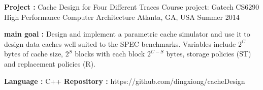 \begin{cventries}
\cventry
{\textbf{Project :} Cache Design for Four Different Traces} 
{Course project: Gatech CS6290 High Performance Computer Architecture} 
{Atlanta, GA, USA} %
{Summer 2014} %
{
  \begin{cvitems}
  \item {\textbf{main goal :} Design and implement a parametric cache
      simulator and use it to design data caches well suited to the SPEC benchmarks. 
      Variables include $2^C$ bytes of cache size, $2^S$ blocks with each block $2^{C-S}$ bytes,
      storage policies (ST) and replacement policies (R).
    }
  \item {\textbf{Language :} C++  \quad
      \textbf{Repository :} {\color{red} https://github.com/dingxiong/cacheDesign}
    }
  \end{cvitems}
}








\end{cventries}